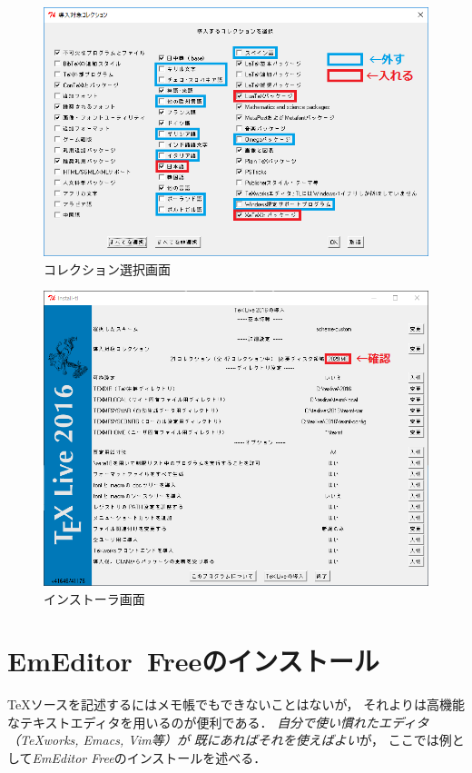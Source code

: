 \documentclass{ltjsarticle}
\begin{document}
\begin{enumerate}
  \clearpage
  \begin{figure}[t]
    \centering
    \includegraphics[scale=.7]{tl16col.png}
    \caption{コレクション選択画面}\label{col}
  \end{figure}

  \begin{figure}[b]
    \centering
    \includegraphics[scale=.5]{tl16top.png}
    \caption{インストーラ画面}\label{top}
  \end{figure}
\end{enumerate}


\section{EmEditor~Freeのインストール}
\TeX ソースを記述するにはメモ帳でもできないことはないが，
それよりは高機能なテキストエディタを用いるのが便利である．
\emph{自分で使い慣れたエディタ（\TeX works, Emacs, Vim等）が
  既にあればそれを使えばよい}が，
ここでは例として\emph{EmEditor Free}のインストールを述べる．
\end{document}
